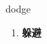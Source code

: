 
\begin{frame}
{\huge dodge}
\begin{center}
\begin{enumerate}\Large
  \item \textbf{躲避}
\end{enumerate}
\end{center}
\end{frame}
